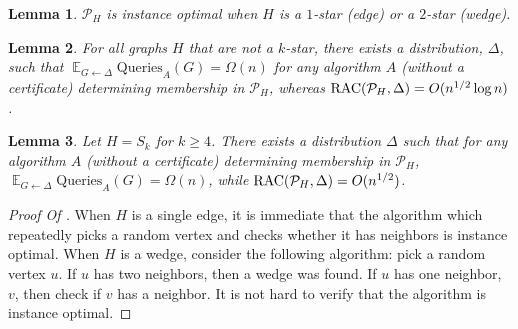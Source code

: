 \documentclass[11pt]{article}
\numberwithin{equation}{section}
\newtheorem{lemma}[lemma]{Lemma}
\newcommand\E{\mathop{\mathbb E}}
\newcommand{\Query}{\text{Queries}}
\renewcommand{\P}{\mathcal{P}}
\newcommand{\kstar}[1]{\ensuremath{#1}-star}
\newcommand{\1}{\mathbf{1}}
\begin{document}
 \begin{lemma} \label{lemma:deg1}
$\mathcal{P}_H$ is instance optimal when $H$ is a \kstar{1} (edge) or a \kstar{2} (wedge).
 \end{lemma}
 


 \begin{lemma} \label{lemma:star}
 For all graphs $H$ that are not a \kstar{k}, there exists a distribution, $\Delta$, such that $\E_{G \leftarrow \Delta} \Query_A(G) = \Omega(n)$ for any algorithm $A$ (without a certificate) determining membership in $\P_H$, whereas $\RACC(\P_H,\Delta) = O(n^{1/2} \log n)$. 
 \end{lemma}
 
 \begin{lemma} \label{lemma:paths}
Let $H = S_k$ for $k \geq 4$. There exists a distribution $\Delta$ such that for any algorithm $A$ (without a certificate) determining membership in $\P_H$, $\E_{G \leftarrow \Delta} \Query_A(G) = \Omega(n)$, while $\RACC(\P_H,\Delta) = O(n^{1/2})$. 
 \end{lemma}



\begin{proof}[Proof Of ]
When $H$ is a single edge, it is immediate that the algorithm which repeatedly picks a random vertex and checks whether it has neighbors is instance optimal. When $H$ is a wedge, consider the following algorithm: pick a random vertex $u$. If $u$ has two neighbors, then a wedge was found. If $u$ has one neighbor, $v$, then check if $v$ has a neighbor. It is not hard to verify that the algorithm is instance optimal.
\end{proof}
\end{document}
